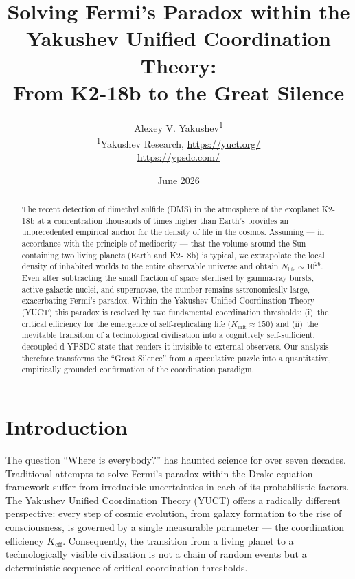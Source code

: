 \documentclass[12pt,a4paper]{article}
\title{\bfseries Solving Fermi's Paradox within the Yakushev Unified
	Coordination Theory: \\ From K2-18b to the Great Silence}
\author{Alexey V. Yakushev\textsuperscript{1} \\
	\small \textsuperscript{1}Yakushev Research, \url{https://yuct.org/} \\
	\small \url{https://ypsdc.com/}}
\date{June 2026}
\newcommand{\Keff}{K_{\mathrm{eff}}}
\begin{document}
	\maketitle
	
	\begin{abstract}
		The recent detection of dimethyl sulfide (DMS) in the atmosphere of the
		exoplanet K2-18b at a concentration thousands of times higher than
		Earth's provides an unprecedented empirical anchor for the density of
		life in the cosmos.  Assuming --- in accordance with the principle of
		mediocrity --- that the volume around the Sun containing two living
		planets (Earth and K2-18b) is typical, we extrapolate the local
		density of inhabited worlds to the entire observable universe and
		obtain $N_{\mathrm{life}} \sim 10^{26}$.  Even after subtracting the
		small fraction of space sterilised by gamma-ray bursts, active
		galactic nuclei, and supernovae, the number remains astronomically
		large, exacerbating Fermi's paradox.  Within the Yakushev Unified
		Coordination Theory (YUCT) this paradox is resolved by two
		fundamental coordination thresholds: (i)~the critical efficiency for
		the emergence of self-replicating life ($K_{\mathrm{crit}}\approx150$)
		and (ii)~the inevitable transition of a technological civilisation
		into a cognitively self-sufficient, decoupled d-YPSDC state that
		renders it invisible to external observers.  Our analysis therefore
		transforms the ``Great Silence'' from a speculative puzzle into a
		quantitative, empirically grounded confirmation of the coordination
		paradigm.
	\end{abstract}
	
	\section{Introduction}
	The question ``Where is everybody?'' has haunted science for over
	seven decades.  Traditional attempts to solve Fermi's paradox within
	the Drake equation framework suffer from irreducible uncertainties in
	each of its probabilistic factors.  The Yakushev Unified Coordination
	Theory (YUCT) offers a radically different perspective: every step of
	cosmic evolution, from galaxy formation to the rise of consciousness,
	is governed by a single measurable parameter --- the coordination
	efficiency $\Keff$.  Consequently, the transition from a living planet
	to a technologically visible civilisation is not a chain of random
	events but a deterministic sequence of critical coordination
	thresholds.
	
\end{document}
